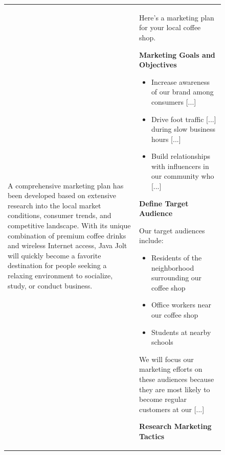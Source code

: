 \begin{figure}[p]
\begin{tabular}{@{}p{}p{}@{}}
    ~

    A comprehensive marketing plan has been developed based on extensive research into the local market conditions, consumer trends, and competitive landscape. With its unique combination of premium coffee drinks and wireless Internet access, Java Jolt will quickly become a favorite destination for people seeking a relaxing environment to socialize, study, or conduct business.
    
    &    
    Here's a marketing plan for your local coffee shop.
    ~
    
    \textbf{Marketing Goals and Objectives}
    \begin{itemize}[leftmargin=8pt]
        \item Increase awareness of our brand among consumers \textcolor[HTML]{808080}{[...]}
        \item Drive foot traffic \textcolor[HTML]{808080}{[...]} during slow business hours \textcolor[HTML]{808080}{[...]}
        \item Build relationships with influencers in our community who \textcolor[HTML]{808080}{[...]}
    \end{itemize}
    
    \textbf{Define Target Audience}
    ~
    
    Our target audiences include:
    \begin{itemize}[leftmargin=8pt]
        \item Residents of the neighborhood surrounding our coffee shop
        \item Office workers near our coffee shop
        \item Students at nearby schools
    \end{itemize}
We will focus our marketing efforts on these audiences because they are most likely to become regular customers at our \textcolor[HTML]{808080}{[...]}
    ~
    
    \textbf{Research Marketing Tactics}


\end{tabular}
\end{figure}
